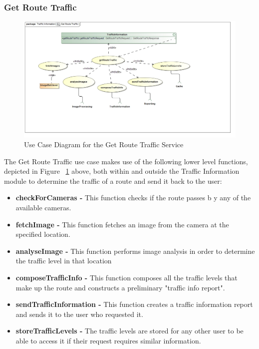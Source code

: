 \documentclass[a4paper,12pt]{article}
\begin{document}
\subsubsection{Get Route Traffic}
\begin{figure}[ht]
\includegraphics[width=\textwidth]{images/Get_Route_Traffic.jpg}
\caption{Use Case Diagram for the Get Route Traffic Service}
\label{fig:uc_gettraffic}
\end{figure}

The Get Route Traffic use case makes use of the following lower level functions, depicted in Figure ~\ref{fig:uc_gettraffic} above, both within and outside the Traffic Information module to determine the traffic of a route and send it back to the user:
\begin{itemize}
\item \textbf{checkForCameras -} This function checks if the route passes b y any of the available cameras.
\item \textbf{fetchImage -} This function fetches an image from the camera at the specified location.
\item \textbf{analyseImage -} This function performs image analysis in order to determine the traffic level in that location
\item \textbf{composeTrafficInfo -} This function composes all the traffic levels that make up the route and constructs a preliminary "traffic info report".
\item \textbf{sendTrafficInformation -} This function creates a traffic information report and sends it to the user who requested it.
\item \textbf{storeTrafficLevels -} The traffic levels are stored for any other user to be able to access it if their request requires similar information.
\end{itemize}
\end{document}
